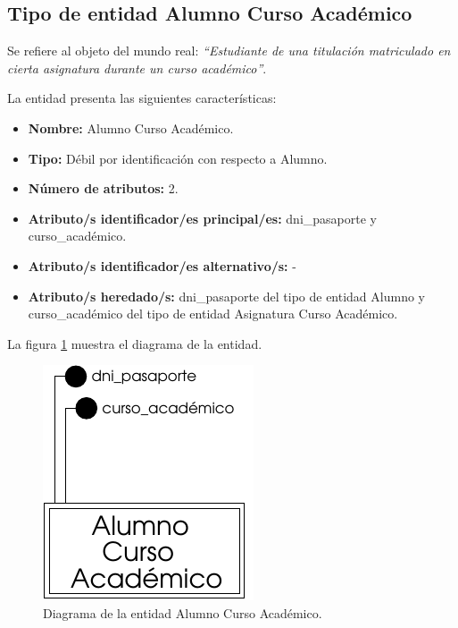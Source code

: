 \subsection{Tipo de entidad Alumno Curso Académico}

   \begin{description}

   \item[Definición] Se refiere al objeto del mundo real: \emph{``Estudiante de
   una titulación matriculado en cierta asignatura durante un curso académico''}.

   \item[Características] La entidad presenta las siguientes características:
      \begin{itemize}
         \item \textbf{Nombre:} Alumno Curso Académico.
         \item \textbf{Tipo:} Débil por identificación con respecto a Alumno.
         \item \textbf{Número de atributos:} 2.
         \item \textbf{Atributo/s identificador/es principal/es:} dni\_pasaporte y \\curso\_académico.
         \item \textbf{Atributo/s identificador/es alternativo/s:} -
         \item \textbf{Atributo/s heredado/s:} dni\_pasaporte del tipo de entidad Alumno y curso\_académico del tipo de entidad Asignatura Curso Académico.
      \end{itemize}

   \item[Diagrama] La figura \ref{diagramaAlumnoCA} muestra el diagrama de la entidad.
   \item \begin{figure}[!ht]
            \begin{center}
            \includegraphics[]{07.Modelo_Entidad-Interrelacion/7.2.Analisis_Entidades/diagramas/alumnoca.pdf}
            \caption{Diagrama de la entidad Alumno Curso Académico.}
            \label{diagramaAlumnoCA}
            \end{center}
         \end{figure}


\end{description}
